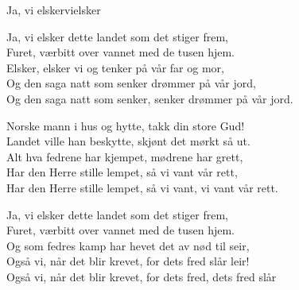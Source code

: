 \begin{song}{Ja, vi elsker}{vielsker}
\begin{vers}
Ja, vi elsker dette landet som det stiger frem,\\
Furet, værbitt over vannet med de tusen hjem.\\
Elsker, elsker vi og tenker på vår far og mor,\\
Og den saga natt som senker drømmer på vår jord,\\
Og den saga natt som senker, senker drømmer på vår jord.\\
\end{vers}
\begin{vers}
Norske mann i hus og hytte, takk din store Gud!\\
Landet ville han beskytte, skjønt det mørkt så ut.\\
Alt hva fedrene har kjempet, mødrene har grett,\\
Har den Herre stille lempet, så vi vant vår rett,\\
Har den Herre stille lempet, så vi vant, vi vant vår rett.\\
\end{vers}
\begin{vers}
Ja, vi elsker dette landet som det stiger frem,\\
Furet, værbitt over vannet med de tusen hjem.\\
Og som fedres kamp har hevet det av nød til seir,\\
Også vi, når det blir krevet, for dets fred slår leir!\\
Også vi, når det blir krevet, for dets fred, dets fred slår \\
\end{vers}
\end{song}
